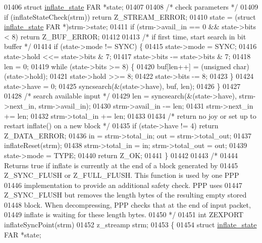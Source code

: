 \begin{DoxyCode}
{{{{{{{{{{{{01406     \textcolor{keyword}{struct }\hyperlink{structinflate__state}{inflate\_state} FAR *state;
01407 
01408     \textcolor{comment}{/* check parameters */}
01409     \textcolor{keywordflow}{if} (inflateStateCheck(strm)) \textcolor{keywordflow}{return} Z\_STREAM\_ERROR;
01410     state = (\textcolor{keyword}{struct }\hyperlink{structinflate__state}{inflate\_state} FAR *)strm->state;
01411     if (strm->avail\_in == 0 && state->bits < 8) \textcolor{keywordflow}{return} Z\_BUF\_ERROR;
01412 
01413     \textcolor{comment}{/* if first time, start search in bit buffer */}
01414     \textcolor{keywordflow}{if} (state->mode != SYNC) \{
01415         state->mode = SYNC;
01416         state->hold <<= state->bits & 7;
01417         state->bits -= state->bits & 7;
01418         len = 0;
01419         \textcolor{keywordflow}{while} (state->bits >= 8) \{
01420             buf[len++] = (\textcolor{keywordtype}{unsigned} char)(state->hold);
01421             state->hold >>= 8;
01422             state->bits -= 8;
01423         \}
01424         state->have = 0;
01425         syncsearch(&(state->have), buf, len);
01426     \}
01427 
01428     \textcolor{comment}{/* search available input */}
01429     len = syncsearch(&(state->have), strm->next\_in, strm->avail\_in);
01430     strm->avail\_in -= len;
01431     strm->next\_in += len;
01432     strm->total\_in += len;
01433 
01434     \textcolor{comment}{/* return no joy or set up to restart inflate() on a new block */}
01435     \textcolor{keywordflow}{if} (state->have != 4) \textcolor{keywordflow}{return} Z\_DATA\_ERROR;
01436     in = strm->total\_in;  out = strm->total\_out;
01437     inflateReset(strm);
01438     strm->total\_in = in;  strm->total\_out = out;
01439     state->mode = TYPE;
01440     \textcolor{keywordflow}{return} Z\_OK;
01441 \}
01442 
01443 \textcolor{comment}{/*}
01444 \textcolor{comment}{   Returns true if inflate is currently at the end of a block generated by}
01445 \textcolor{comment}{   Z\_SYNC\_FLUSH or Z\_FULL\_FLUSH. This function is used by one PPP}
01446 \textcolor{comment}{   implementation to provide an additional safety check. PPP uses}
01447 \textcolor{comment}{   Z\_SYNC\_FLUSH but removes the length bytes of the resulting empty stored}
01448 \textcolor{comment}{   block. When decompressing, PPP checks that at the end of input packet,}
01449 \textcolor{comment}{   inflate is waiting for these length bytes.}
01450 \textcolor{comment}{ */}
01451 \textcolor{keywordtype}{int} ZEXPORT inflateSyncPoint(strm)
01452 z\_streamp strm;
01453 \{
01454     \textcolor{keyword}{struct }\hyperlink{structinflate__state}{inflate\_state} FAR *state;
}}}}}}}}}}}}
\end{DoxyCode}
